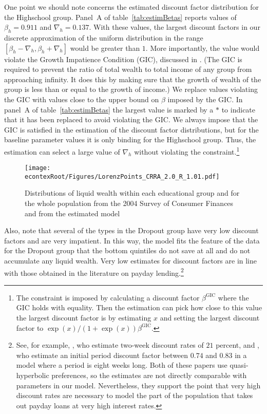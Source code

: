 \documentclass[\econtexRoot/HAFiscal]{subfiles}
\begin{document}
One point we should note concerns the estimated discount factor distribution for the Highschool group. Panel~A of table~\ref{tab:estimBetas} reports values of $\beta_h=0.911$ and $\nabla_h=0.137$. With these values, the largest discount factors in our discrete approximation of the uniform distribution in the range $[\beta_h-\nabla_h, \beta_h+\nabla_h]$ would be greater than $1$. More importantly, the value would violate the Growth Impatience Condition (GIC), discussed in \cite{carroll2022theoretical}. (The GIC is required to prevent the ratio of total wealth to total income of any group from approaching infinity.  It does this by making sure that the growth of wealth of the group is less than or equal to the growth of income.)  We replace values violating the GIC with values close to the upper bound on $\beta$ imposed by the GIC. In panel~A of table~\ref{tab:estimBetas} the largest value is marked by a $*$ to indicate that it has been replaced to avoid violating the GIC. We always impose that the GIC is satisfied in the estimation of the discount factor distributions, but for the baseline parameter values it is only binding for the Highschool group. Thus, the estimation can select a large value of $\nabla_h$ without violating the constraint.\footnote{The constraint is imposed by calculating a discount factor $\beta^{\text{GIC}}$ where the GIC holds with equality. Then the estimation can pick how close to this value the largest discount factor is by estimating $x$ and setting the largest discount factor to $\exp(x)/(1+\exp(x)) \beta^{\text{GIC}}$.} 

\begin{figure}[th]
  \begin{center}
    \texttt{[image: \\econtexRoot/Figures/LorenzPoints\_CRRA\_2.0\_R\_1.01.pdf]}
    \caption{Distributions of liquid wealth within each educational group and for the whole population from the 2004 Survey of Consumer Finances and from the estimated model}
    \notinsubfile{\label{fig:LorenzPts}}
  \end{center}
\end{figure}

Also, note that several of the types in the Dropout group have very low discount factors and are very impatient. In this way, the model fits the feature of the data for the Dropout group that the bottom quintiles do not save at all and do not accumulate any liquid wealth. Very low estimates for discount factors are in line with those obtained in the literature on payday lending.\footnote{See, for example, \cite{skiba2008payday}, who estimate two-week discount rates of $21$ percent, and \cite{allcott2021high}, who estimate an initial period discount factor between $0.74$ and $0.83$ in a model where a period is eight weeks long. Both of these papers use quasi-hyperbolic preferences, so the estimates are not directly comparable with parameters in our model. Nevertheless, they support the point that very high discount rates are necessary to model the part of the population that takes out payday loans at very high interest rates.} 
\end{document}

